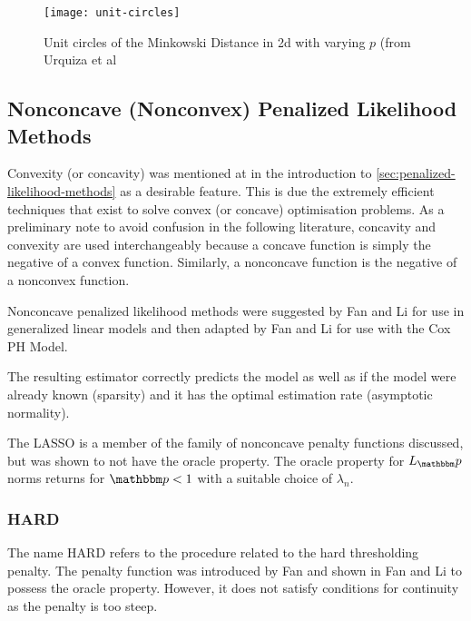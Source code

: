 \begin{figure}[ht!]
  \texttt{[image: unit-circles]}
  \caption{Unit circles of the Minkowski Distance in 2d with varying $p$ (from Urquiza et al }
  \label{fig:unit-circles}
\end{figure}

\subsection{Nonconcave (Nonconvex) Penalized Likelihood Methods}

Convexity (or concavity) was mentioned at in the introduction to \cref{sec:penalized-likelihood-methods} as a desirable feature. This is due the extremely efficient techniques that exist to solve convex (or concave) optimisation problems. As a preliminary note to avoid confusion in the following literature, concavity and convexity are used interchangeably because a concave function is simply the negative of a convex function. Similarly, a nonconcave function is the negative of a nonconvex function.

Nonconcave penalized likelihood methods were suggested by Fan and Li  for use in generalized linear models and then adapted by Fan and Li  for use with the Cox PH Model.

\begin{definition}\label{def:oracle-property}
    The resulting estimator correctly predicts the model as well as if the model were already known (sparsity) and it has the optimal estimation rate (asymptotic normality).
\end{definition}

The LASSO is a member of the family of nonconcave penalty functions discussed, but was shown to not have the oracle property. The oracle property for $L_\p$ norms returns for $\p<1$ with a suitable choice of $\lambda_n$.

\subsubsection{HARD}

The name HARD refers to the procedure related to the hard thresholding penalty. The penalty function was introduced by Fan  and shown in Fan and Li  to possess the oracle property. However, it does not satisfy conditions for continuity as the penalty is too steep.

